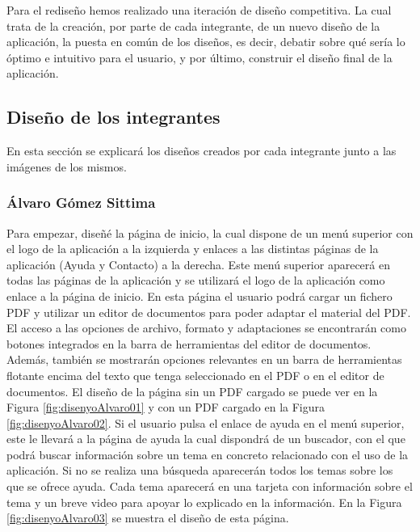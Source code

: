 Para el rediseño hemos realizado una iteración de diseño competitiva. La cual trata de la creación, por parte de cada integrante, de un nuevo diseño de la aplicación, la puesta en común de los diseños, es decir, debatir sobre qué sería lo óptimo e intuitivo para el usuario, y por último, construir el diseño final de la aplicación.

\subsection{Diseño de los integrantes}
En esta sección se explicará los diseños creados por cada integrante junto a las imágenes de los mismos. 
\subsubsection{Álvaro Gómez Sittima}
Para empezar, diseñé la página de inicio, la cual dispone de un menú superior con el logo de la aplicación a la izquierda y enlaces a las distintas páginas de la aplicación (Ayuda y Contacto) a la derecha. Este menú superior aparecerá en todas las páginas de la aplicación y se utilizará el logo de la aplicación como enlace a la página de inicio. En esta página el usuario podrá cargar un fichero PDF y utilizar un editor de documentos para poder adaptar el material del PDF. El acceso a las opciones de archivo, formato y adaptaciones se encontrarán como botones integrados en la barra de herramientas del editor de documentos. Además, también se mostrarán opciones relevantes en un barra de herramientas flotante encima del texto que tenga seleccionado en el PDF o en el editor de documentos. El diseño de la página sin un PDF cargado se puede ver en la Figura \ref{fig:disenyoAlvaro01} y con un PDF cargado en la Figura \ref{fig:disenyoAlvaro02}. Si el usuario pulsa el enlace de ayuda en el menú superior, este le llevará a la página de ayuda la cual dispondrá de un buscador, con el que podrá buscar información sobre un tema en concreto relacionado con el uso de la aplicación. Si no se realiza una búsqueda aparecerán todos los temas sobre los que se ofrece ayuda. Cada tema aparecerá en una tarjeta con información sobre el tema y un breve video para apoyar lo explicado en la información. En la Figura \ref{fig:disenyoAlvaro03} se muestra el diseño de esta página.

